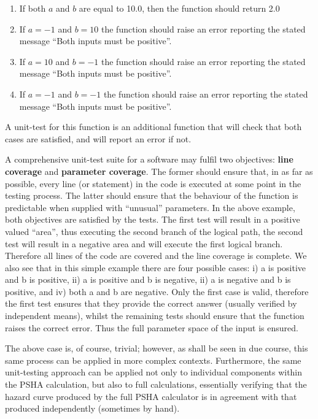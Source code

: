 \begin{enumerate}
\item If both $a$ and $b$ are equal to 10.0, then the function 
    should return 2.0
\item If $a = -1$ and $b = 10$ the function should raise an error 
    reporting the stated message ``Both inputs must be positive''.
\item If $a = 10$ and $b = -1$ the function should raise an error 
    reporting the stated message ``Both inputs must be positive''.
\item If $a = -1$ and $b = -1$ the function should raise an error 
    reporting the stated message ``Both inputs must be positive''.
\end{enumerate}

A unit-test for this function is an additional function that will 
check that both cases are satisfied, and will report an error if not. 

A comprehensive unit-test suite for a software may fulfil two objectives: 
\textbf{line coverage} and \textbf{parameter coverage}. The former should 
ensure that, in as far as possible, every line (or statement) in the code 
is executed at some point in the testing process. The latter should ensure
that the behaviour of the function is predictable when supplied with 
``unusual'' parameters. In the above example, both objectives are satisfied
by the tests. The first test will result in a positive valued ``area'',
thus executing the second branch of the logical path, the second test will
result in a negative area and will execute the first logical branch. 
%
Therefore all lines of the code are covered and the line coverage is 
complete. We also see that in this simple example there are four possible
cases: i) a is positive and b is positive, ii) a is positive and b is 
negative,  ii) a is negative and b is positive, and iv) both a and b 
are negative. Only the first case is valid, therefore the first test 
ensures that they provide the correct answer (usually verified by 
independent means), whilst the remaining tests should ensure that 
the function raises the correct error. Thus the full parameter space 
of the input is ensured.

The above case is, of course, trivial; however, as shall be seen in due
course, this same process can be applied in more complex contexts. 
%
Furthermore, the same unit-testing approach can be applied not only 
to individual components within the PSHA calculation, but also to 
full calculations, essentially verifying that the hazard curve 
produced by the full PSHA calculator is in agreement with that 
produced independently (sometimes by hand).
%
